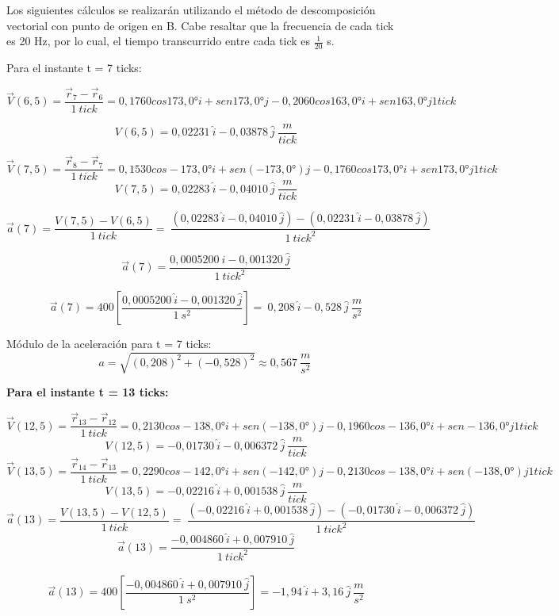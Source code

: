 \documentclass[../main.tex]{subfiles}
\begin{document}

Los siguientes cálculos se realizarán utilizando el método de descomposición vectorial con punto de origen en B. Cabe resaltar que la frecuencia de cada tick es 20 Hz, por lo cual,
el tiempo transcurrido entre cada tick es $\frac{1}{20}$ s.


Para el instante t = 7 ticks:

\[\vec{V}\left(6,5\right)=\frac{{\vec{r}}_7-{\vec{r}}_6}{1\ tick}=0,1760cos173,0°i+sen173,0° j-0,2060cos163,0°i+sen163,0° j1 tick\]

\[V\left(6,5\right)=0,02231\ \hat{i}-0,03878\ \hat{j}\ \frac{m}{tick}\]

\[\vec{V}\left(7,5\right)=\frac{{\vec{r}}_8-{\vec{r}}_7}{1\ tick}=0,1530cos-173,0°i+sen(-173,0°)j-0,1760cos173,0°i+sen173,0°j1 tick\]
\[V\left(7,5\right)=0,02283\ \hat{i}-0,04010\ \hat{j}\ \frac{m}{tick}\]

\[\vec{a}\left(7\right)=\frac{V\left(7,5\right)-V\left(6,5\right)}{1\ tick}=\ \frac{\left(0,02283\ \hat{i}-0,04010\ \hat{j}\right)-\left(0,02231\ \hat{i}-0,03878\ \hat{j}\right)}{1\ {tick}^2}\]

\[\vec{a}\left(7\right)=\frac{0,0005200\ \hat{i}-0,001320\ \hat{j}}{1\ {tick}^2}\]

\[\vec{a}\left(7\right)=400\left[\frac{0,0005200\ \hat{i}-0,001320\ \hat{j}}{1\ s^2}\right]=\ 0,208\ \hat{i}-0,528\ \hat{j}\ \frac{m}{s^2}\]


Módulo de la aceleración para t = 7 ticks:
\[a=\sqrt{\left(0,208\right)^2+\left(-0,528\right)^2}\approx0,567\ \frac{m}{s^2}\ \]

\textbf{Para el instante t = 13 ticks:}

\[\vec{V}\left(12,5\right)=\frac{{\vec{r}}_{13}-{\vec{r}}_{12}}{1\ tick}=0,2130cos-138,0°i+sen(-138,0°)j-0,1960cos-136,0°i+sen-136,0° j1 tick\]
\[V\left(12,5\right)=-0,01730\ \hat{i}-0,006372\ \hat{j}\ \frac{m}{tick}\]
\[\vec{V}\left(13,5\right)=\frac{{\vec{r}}_{14}-{\vec{r}}_{13}}{1\ tick}=0,2290cos-142,0°i+sen(-142,0°)j-0,2130cos-138,0°i+sen(-138,0°)j1 tick\]
\[V\left(13,5\right)=-0,02216\ \hat{i}+0,001538\ \hat{j}\ \frac{m}{tick}\]
\[\vec{a}\left(13\right)=\frac{V\left(13,5\right)-V\left(12,5\right)}{1\ tick}=\ \frac{\left(-0,02216\ \hat{i}+0,001538\ \hat{j}\right)-\left(-0,01730\ \hat{i}-0,006372\ \hat{j}\right)}{1\ {tick}^2}\]
\[\vec{a}\left(13\right)=\frac{-0,004860\ \hat{i}+0,007910\ \hat{j}}{1\ {tick}^2}\]\
\[\vec{a}\left(13\right)=400\left[\frac{-0,004860\ \hat{i}+0,007910\ \hat{j}}{1\ s^2}\right]=-1,94\ \hat{i}+3,16\ \hat{j}\ \frac{m}{s^2}\]
\end{document}
